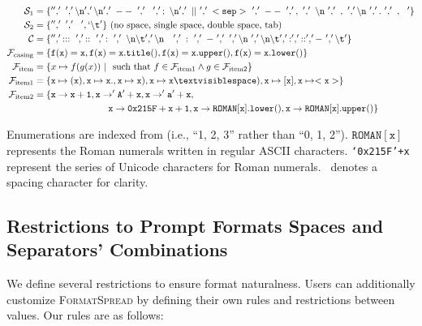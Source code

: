 \documentclass{article} %
\newcommand{\toolname}[1]{}
\renewcommand{\toolname}[1]{{\color{black} \textsc{FormatSpread}}}
\begin{document}
\begin{footnotesize}
\begin{align*}
    \mathcal{S}_1&=\mathtt{\{ '', '\ ', '\backslash n', ' \backslash n', '\ --\ ', '\ \ ', ';\ \backslash n', '\ ||\ ', '\ <sep>\ ', '\ --\ ', ',\ ', '\ \backslash n\ ', '\ ,\ ', '\backslash n\ ', '.\ ', '\ ,\ \ ' \}}\\ %
    \mathcal{S}_2&=\mathtt{\{'', '\ ', '\ \ ', `\backslash t'\}} \text{\ (no space, single space, double space, tab)}\\ %
    \mathcal{C}&=\mathtt{\{ '', ':::\ ', '::\ ', ':\ ', '\ \backslash n \backslash t', '\backslash n\ \ \ ', '\ :\ ', '\ -\ ', '\ ', '\backslash n\ ', '\backslash n \backslash t', ':', '::', '-\ ', '\backslash t' \}}\\ %
    \mathcal{F}_\text{casing}&=\mathtt{\{f(x)=x, f(x)=x.title(), f(x)=x.upper(), f(x)=x.lower()\}}\\ %
    \mathcal{F}_\text{item}&=\{x\mapsto f(g(x)) \ | \ \text{ such that } f\in\mathcal{F}_\text{item1} \wedge g\in\mathcal{F}_\text{item2} \}\\
    \mathcal{F}_\text{item1} &= \mathtt{\{x \mapsto(x), x \mapsto x., x \mapsto x), x \mapsto x\textvisiblespace), x \mapsto [x], x \mapsto <x> \}} \\ %
    \mathcal{F}_\text{item2}&=\mathtt{\{x \rightarrow x + 1, x \rightarrow 'A' + x, x \rightarrow 'a' + x,}\\ &\mathtt{ \ \ \ \ \ \ \ \  \ \ \ \ \ \ \ \ \ \ \ \ \ \ \ \ x \rightarrow 0x215F + x + 1, x \rightarrow ROMAN[x].lower(), x \rightarrow ROMAN[x].upper()\}}
\end{align*}
\end{footnotesize}

Enumerations are indexed from (i.e., ``1, 2, 3'' rather than ``0, 1, 2''). $\mathtt{ROMAN[x]}$ represents the Roman numerals written in regular ASCII characters. 
\texttt{`0x215F'+x} represent the series of Unicode characters for Roman numerals. \textvisiblespace \ denotes a spacing character for clarity.

\subsection{Restrictions to Prompt Formats Spaces and Separators' Combinations}\label{app:holistic_restrictions}
We define several restrictions to ensure format naturalness. Users can additionally customize \toolname{} by defining their own rules and restrictions between values. Our rules are as follows:
\end{document}
